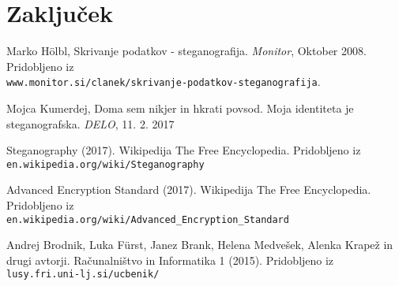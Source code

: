 \documentclass[a4paper, 12pt]{article}
\begin{document}
\section{Zaključek}


\begin{thebibliography}{9}

        Marko Hölbl, Skrivanje podatkov - steganografija. \textit{Monitor}, Oktober 2008. Pridobljeno iz\\
        \texttt{www.monitor.si/clanek/skrivanje-podatkov-steganografija}. 
    
        Mojca Kumerdej, Doma sem nikjer in hkrati povsod. Moja identiteta je steganografska. \textit{DELO}, 11. 2. 2017
     
        Steganography (2017). Wikipedija The Free Encyclopedia. Pridobljeno iz
        \texttt{en.wikipedia.org/wiki/Steganography}
     
        Advanced Encryption Standard (2017). Wikipedija The Free Encyclopedia. Pridobljeno iz\\  
        \texttt{en.wikipedia.org/wiki/Advanced\_Encryption\_Standard}

        Andrej Brodnik, Luka F\"urst, Janez Brank, Helena Medvešek, Alenka Krapež in drugi avtorji. Računalništvo in Informatika 1 (2015). Pridobljeno iz \texttt{lusy.fri.uni-lj.si/ucbenik/}

\end{thebibliography}
 
\end{document}
